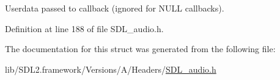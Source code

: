 Userdata passed to callback (ignored for N\+U\+LL callbacks). 

Definition at line 188 of file S\+D\+L\+\_\+audio.\+h.



The documentation for this struct was generated from the following file\+:\begin{DoxyCompactItemize}
\item 
lib/\+S\+D\+L2.\+framework/\+Versions/\+A/\+Headers/\mbox{\hyperlink{_s_d_l__audio_8h}{S\+D\+L\+\_\+audio.\+h}}\end{DoxyCompactItemize}
